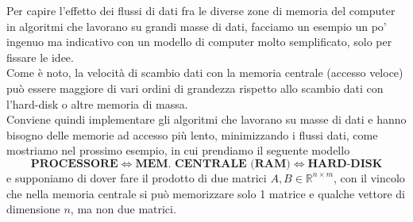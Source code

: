\documentclass[12pt]{article}
\begin{document}
Per capire l'effetto dei flussi di dati fra le diverse zone di memoria del computer in algoritmi che lavorano su grandi masse di dati, facciamo un esempio un po' ingenuo ma indicativo con un modello di computer molto semplificato, solo per fissare le idee.\\
Come è noto, la velocità di scambio dati con la memoria centrale (accesso veloce) può essere maggiore di vari ordini di grandezza rispetto allo scambio dati con l'hard-disk o altre memoria di massa. \\ 
Conviene quindi implementare gli algoritmi che lavorano su masse di dati e hanno bisogno delle memorie ad accesso più lento, minimizzando i flussi dati, come mostriamo nel prossimo esempio, in cui prendiamo il seguente modello
\[ \textbf{PROCESSORE} \iff \textbf{MEM. CENTRALE (RAM)} \iff \textbf{HARD-DISK} \]
e supponiamo di dover fare il prodotto di due matrici $A,B\in \mathbb{R}^{n\times m}$, con il vincolo che nella memoria centrale si può memorizzare solo 1 matrice e qualche vettore di dimensione $n$, ma non due matrici.
\end{document}

